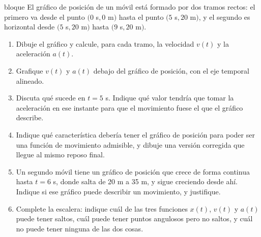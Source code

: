 \documentclass[11pt,openany]{book}
\begin{document}
\begin{ejercicio}{bloque}
El gráfico de posición de un móvil está formado por dos tramos rectos: el primero va desde el punto $(0$ s$, 0$ m$)$ hasta el punto $(5$ s$, 20$ m$)$, y el segundo es horizontal desde $(5$ s$, 20$ m$)$ hasta $(9$ s$, 20$ m$)$.
\begin{enumerate}[label=(\alph*), leftmargin=1.7em, itemsep=1pt, topsep=3pt]
  \item Dibuje el gráfico y calcule, para cada tramo, la velocidad $v(t)$ y la aceleración $a(t)$.
  \item Grafique $v(t)$ y $a(t)$ debajo del gráfico de posición, con el eje temporal alineado.
  \item Discuta qué sucede en $t = 5$ s. Indique qué valor tendría que tomar la aceleración en ese instante para que el movimiento fuese el que el gráfico describe.
  \item Indique qué característica debería tener el gráfico de posición para poder ser una función de movimiento admisible, y dibuje una versión corregida que llegue al mismo reposo final.
  \item Un segundo móvil tiene un gráfico de posición que crece de forma continua hasta $t = 6$ s, donde salta de 20 m a 35 m, y sigue creciendo desde ahí. Indique si ese gráfico puede describir un movimiento, y justifique.
  \item Complete la escalera: indique cuál de las tres funciones $x(t)$, $v(t)$ y $a(t)$ puede tener saltos, cuál puede tener puntos angulosos pero no saltos, y cuál no puede tener ninguna de las dos cosas.
\end{enumerate}
\end{ejercicio}
\end{document}
